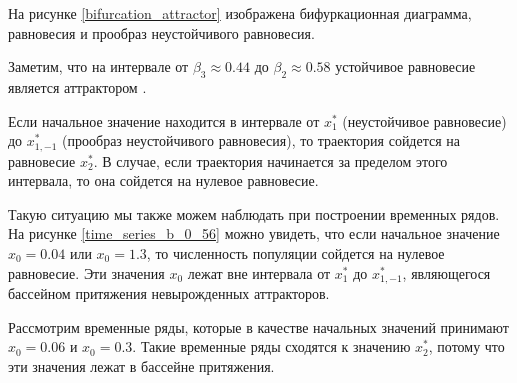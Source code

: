     На рисунке \ref{bifurcation_attractor} изображена бифуркационная диаграмма, равновесия и прообраз неустойчивого равновесия.

    Заметим, что на интервале от \(\beta_3 \approx 0.44\) до \(\beta_2 \approx 0.58\) устойчивое равновесие является аттрактором \cite{elementsOfNonlinearDynamic}.

    Если начальное значение находится в интервале от \(x_1^*\) (неустойчивое равновесие) до \(x_{1, -1}^*\) (прообраз неустойчивого равновесия), то траектория сойдется на равновесие \(x_2^*\). В случае, если траектория начинается за пределом этого интервала, то она сойдется на нулевое равновесие.

    Такую ситуацию мы также можем наблюдать при построении временных рядов. На рисунке \ref{time_series_b_0_56} можно увидеть, что если начальное значение \(x_0 = 0.04\) или \(x_0 = 1.3\), то численность популяции сойдется на нулевое равновесие. Эти значения \(x_0\) лежат вне интервала от \(x_1^*\) до \(x_{1, -1}^*\), являющегося бассейном притяжения невырожденных аттракторов.

    Рассмотрим временные ряды, которые в качестве начальных значений принимают \(x_0 = 0.06\) и \(x_0 = 0.3\). Такие временные ряды сходятся к значению \(x_2^*\), потому что эти значения лежат в бассейне притяжения.
